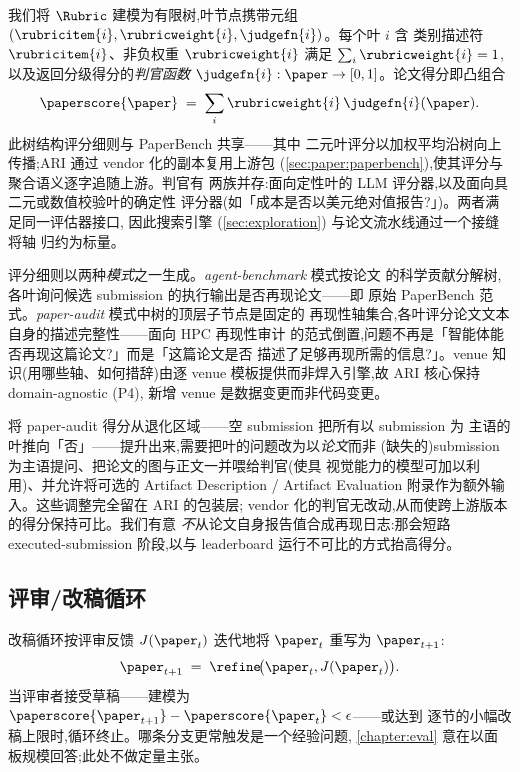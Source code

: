 我们将 $\Rubric$ 建模为有限树,叶节点携带元组
$(\rubricitem{i},\rubricweight{i},\judgefn{i})$。每个叶 $i$ 含
类别描述符 $\rubricitem{i}$、非负权重 $\rubricweight{i}$ 满足
$\sum_i \rubricweight{i}=1$,以及返回分级得分的\emph{判官函数}
$\judgefn{i}:\paper\to[0,1]$。论文得分即凸组合
\begin{equation}\label{eq:paperscore}
  \paperscore{\paper} \;=\; \sum_i \rubricweight{i}\,\judgefn{i}(\paper).
\end{equation}
此树结构评分细则与 PaperBench \cite{starace2025paperbench} 共享——其中
二元叶评分以加权平均沿树向上传播;ARI 通过 vendor 化的副本复用上游包
(\cref{sec:paper:paperbench}),使其评分与聚合语义逐字追随上游。判官有
两族并存:面向定性叶的 LLM 评分器,以及面向具二元或数值校验叶的确定性
评分器(如「成本是否以美元绝对值报告?」)。两者满足同一评估器接口,
因此搜索引擎 (\cref{sec:exploration}) 与论文流水线通过一个接缝将轴
归约为标量。

评分细则以两种\emph{模式}之一生成。\emph{agent-benchmark} 模式按论文
的科学贡献分解树,各叶询问候选 submission 的执行输出是否再现论文——即
原始 PaperBench 范式。\emph{paper-audit} 模式中树的顶层子节点是固定的
再现性轴集合,各叶评分论文文本自身的描述完整性——面向 HPC 再现性审计
的范式倒置,问题不再是「智能体能否再现这篇论文?」而是「这篇论文是否
描述了足够再现所需的信息?」。venue 知识(用哪些轴、如何措辞)由逐
venue 模板提供而非焊入引擎,故 ARI 核心保持 domain-agnostic (P4),
新增 venue 是数据变更而非代码变更。

将 paper-audit 得分从退化区域——空 submission 把所有以 submission 为
主语的叶推向「否」——提升出来,需要把叶的问题改为以\emph{论文}而非
(缺失的)submission 为主语提问、把论文的图与正文一并喂给判官(使具
视觉能力的模型可加以利用)、并允许将可选的 Artifact Description /
Artifact Evaluation 附录作为额外输入。这些调整完全留在 ARI 的包装层;
vendor 化的判官无改动,从而使跨上游版本的得分保持可比。我们有意
\emph{不}从论文自身报告值合成再现日志:那会短路 executed-submission
阶段,以与 leaderboard 运行不可比的方式抬高得分。

\subsection{评审/改稿循环}\label{sec:paper:loop}

改稿循环按评审反馈 $J(\paper_t)$ 迭代地将 $\paper_t$ 重写为
$\paper_{t+1}$:
\begin{equation}\label{eq:refine}
  \paper_{t+1} \;=\; \refine\!\bigl(\paper_t, J(\paper_t)\bigr).
\end{equation}
当评审者接受草稿——建模为
$\paperscore{\paper_{t+1}}-\paperscore{\paper_t}<\epsilon$——或达到
逐节的小幅改稿上限时,循环终止。哪条分支更常触发是一个经验问题,
\cref{chapter:eval} 意在以面板规模回答;此处不做定量主张。


